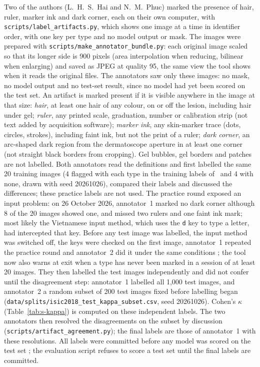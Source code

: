 \documentclass[10pt,a4paper]{article}
\begin{document}
Two of the authors (L.~H.~S.~Hai and N.~M.~Phuc) marked the presence of hair, ruler, marker ink and dark corner, each on their own computer, with \texttt{scripts/label\_artifacts.py}, which shows one image at a time in identifier order, with one key per type and no model output or mask. The images were prepared with \texttt{scripts/make\_annotator\_bundle.py}: each original image scaled so that its longer side is 900 pixels (area interpolation when reducing, bilinear when enlarging) and saved as JPEG at quality 95, the same view the tool shows when it reads the original files. The annotators saw only these images: no mask, no model output and no test-set result, since no model had yet been scored on the test set. An artifact is marked present if it is visible anywhere in the image at that size: \emph{hair}, at least one hair of any colour, on or off the lesion, including hair under gel; \emph{ruler}, any printed scale, graduation, number or calibration strip (not text added by acquisition software); \emph{marker ink}, any skin-marker trace (dots, circles, strokes), including faint ink, but not the print of a ruler; \emph{dark corner}, an arc-shaped dark region from the dermatoscope aperture in at least one corner (not straight black borders from cropping). Gel bubbles, gel borders and patches are not labelled. Both annotators read the definitions and first labelled the same 20 training images (4 flagged with each type in the training labels of~\cite{bissoto2020debiasing} and 4 with none, drawn with seed 20261026), compared their labels and discussed the differences; these practice labels are not used. The practice round exposed an input problem: on 26 October 2026, annotator~1 marked no dark corner although 8 of the 20 images showed one, and missed two rulers and one faint ink mark; most likely the Vietnamese input method, which uses the \texttt{d} key to type a letter, had intercepted that key. Before any test image was labelled, the input method was switched off, the keys were checked on the first image, annotator~1 repeated the practice round and annotator~2 did it under the same conditions ; the tool now also warns at exit when a type has never been marked in a session of at least 20 images. They then labelled the test images independently and did not confer until the disagreement step: annotator~1 labelled all 1,000 test images, and annotator~2 a random subset of 200 test images fixed before labelling began (\texttt{data/splits/isic2018\_test\_kappa\_subset.csv}, seed 20261026). Cohen's $\kappa$ (Table~\ref{tab:s-kappa}) is computed on these independent labels. The two annotators then resolved the disagreements on the subset by discussion (\texttt{scripts/artifact\_agreement.py}); the final labels are those of annotator~1 with these resolutions. All labels were committed before any model was scored on the test set ; the evaluation script refuses to score a test set until the final labels are committed.
\end{document}
